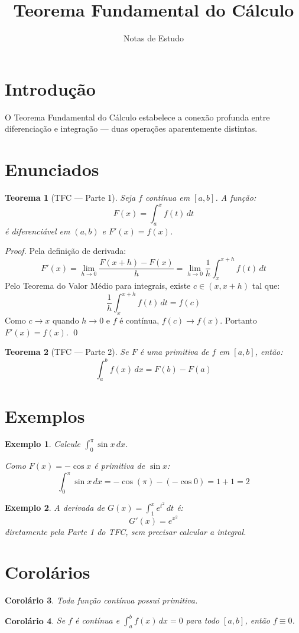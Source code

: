 \documentclass[12pt]{article}
\title{Teorema Fundamental do Cálculo}
\author{Notas de Estudo}
\date{}
\newtheorem{theorem}{Teorema}
\newtheorem{corollary}[theorem]{Corolário}
\newtheorem{example}{Exemplo}
\begin{document}
\maketitle

\section{Introdução}

O Teorema Fundamental do Cálculo estabelece a conexão profunda entre
diferenciação e integração — duas operações aparentemente distintas.

\section{Enunciados}

\begin{theorem}[TFC — Parte 1]
  Seja $f$ contínua em $[a,b]$. A função:
  \[
  F(x) = \int_a^x f(t)\,dt
  \]
  é diferenciável em $(a,b)$ e $F'(x) = f(x)$.
\end{theorem}

\begin{proof}
  Pela definição de derivada:
  \[
  F'(x) = \lim_{h \to 0} \frac{F(x+h) - F(x)}{h}
         = \lim_{h \to 0} \frac{1}{h}\int_x^{x+h} f(t)\,dt
  \]
  Pelo Teorema do Valor Médio para integrais, existe $c \in (x, x+h)$ tal que:
  \[
  \frac{1}{h}\int_x^{x+h} f(t)\,dt = f(c)
  \]
  Como $c \to x$ quando $h \to 0$ e $f$ é contínua, $f(c) \to f(x)$.
  Portanto $F'(x) = f(x)$. \qed
\end{proof}

\begin{theorem}[TFC — Parte 2]
  Se $F$ é uma primitiva de $f$ em $[a,b]$, então:
  \[
  \int_a^b f(x)\,dx = F(b) - F(a)
  \]
\end{theorem}

\section{Exemplos}

\begin{example}
  Calcule $\displaystyle\int_0^\pi \sin x\,dx$.

  Como $F(x) = -\cos x$ é primitiva de $\sin x$:
  \[
  \int_0^\pi \sin x\,dx = -\cos(\pi) - (-\cos 0) = 1 + 1 = 2
  \]
\end{example}

\begin{example}
  A derivada de $\displaystyle G(x) = \int_1^x e^{t^2}\,dt$ é:
  \[
  G'(x) = e^{x^2}
  \]
  diretamente pela Parte 1 do TFC, sem precisar calcular a integral.
\end{example}

\section{Corolários}

\begin{corollary}
  Toda função contínua possui primitiva.
\end{corollary}

\begin{corollary}
  Se $f$ é contínua e $\displaystyle\int_a^b f(x)\,dx = 0$ para todo $[a,b]$,
  então $f \equiv 0$.
\end{corollary}
\end{document}
